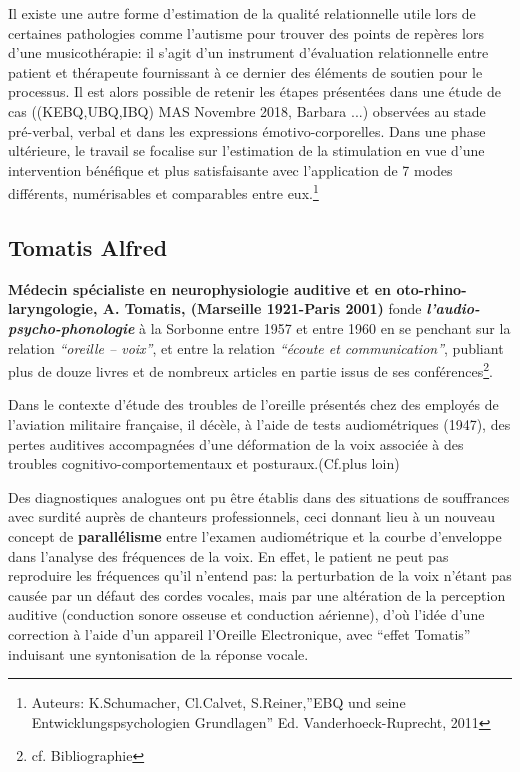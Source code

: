 Il existe une autre forme d'estimation de la qualité relationnelle
utile lors de certaines pathologies comme l'autisme pour trouver des
points de repères lors d'une musicothérapie: il s'agit d'un instrument d'évaluation relationnelle entre patient et
thérapeute fournissant à ce dernier des éléments de soutien pour le
processus. Il est alors possible de retenir les étapes présentées dans une étude de cas
((KEBQ,UBQ,IBQ) MAS Novembre 2018,
Barbara ...) observées au stade pré-verbal, verbal et dans les expressions
émotivo-corporelles.
Dans une phase ultérieure, le travail se focalise sur l'estimation de
la stimulation en vue d'une intervention bénéfique et plus
satisfaisante avec l'application de 7 modes différents, numérisables
et comparables entre eux.\footnote{ Auteurs: K.Schumacher,
  Cl.Calvet, S.Reiner,''EBQ und seine Entwicklungspsychologien Grundlagen'' Ed. Vanderhoeck-Ruprecht, 2011 } 




  



  
\subsection{Tomatis Alfred}

\textbf{Médecin spécialiste en neurophysiologie auditive et en
oto-rhino-laryngologie, A. Tomatis, (Marseille 1921-Paris 2001) } fonde
\textit{\textbf{l'audio-psycho-phonologie }} à la Sorbonne entre 
1957 et entre 1960 en  se penchant sur la relation 
\textit{``oreille -- voix''}, et entre la relation \textit{``écoute
et communication''}, publiant plus de douze livres et de nombreux
articles en partie issus de ses
conférences\footnote{cf. Bibliographie}.

Dans le contexte d'étude des troubles de
l'oreille présentés chez des employés de l'aviation militaire
française, il décèle, à l'aide
de tests audiométriques
 (1947), des pertes auditives accompagnées d'une
déformation de la voix associée à des troubles
cognitivo-comportementaux et posturaux.(Cf.plus loin)

Des diagnostiques analogues ont pu être établis dans des situations
de souffrances avec surdité auprès de chanteurs professionnels,
ceci donnant lieu
à un nouveau concept de
\textbf{parallélisme } entre l'examen audiométrique et la courbe
d'enveloppe dans l'analyse des fréquences de la voix.
En effet, le patient ne peut pas reproduire les fréquences qu'il
n'entend pas: 
la perturbation de la voix n'étant pas causée par un défaut des cordes
vocales, mais par une altération de la perception auditive (conduction
sonore osseuse et conduction aérienne), d'où
l'idée d'une correction à l'aide d'un appareil l'Oreille
Electronique, avec ``effet Tomatis'' induisant
une syntonisation de la réponse vocale.

